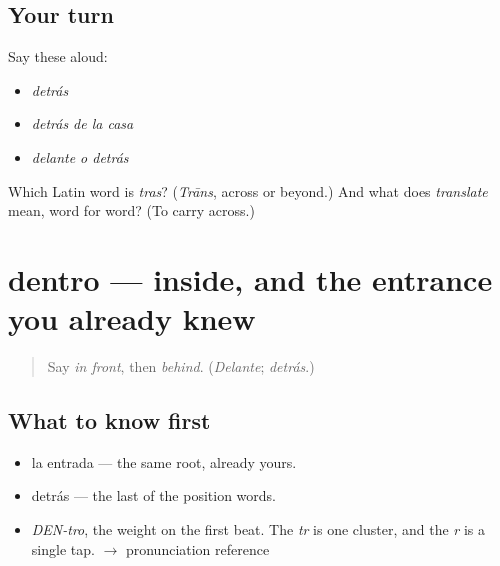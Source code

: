 \subsection*{Your turn}
Say these aloud:

\begin{itemize}
\raggedright
  \item \emph{detrás}
  \item \emph{detrás de la casa}
  \item \emph{delante o detrás}
\end{itemize}

\begin{tcolorbox}[breakable,colback=teal!4,colframe=teal!35!black,title={Before you move on}]
Which Latin word is \emph{tras}? (\emph{Trāns}, across or beyond.) And what does \emph{translate} mean, word for word? (To carry across.)
\end{tcolorbox}
\section[dentro]{dentro — inside, and the entrance you already knew}

\label{lesson:ES-C341-dentro}



\begin{quote}
Say \emph{in front}, then \emph{behind}. (\emph{Delante}; \emph{detrás}.)
\end{quote}

\subsection*{What to know first}
\begin{itemize}
\raggedright
  \item la entrada — the same root, already yours.
  \item detrás — the last of the position words.
\end{itemize}

\begin{sounds}
\begin{itemize}
\raggedright
  \item \emph{DEN-tro}, the weight on the first beat. The \emph{tr} is one cluster, and the \emph{r} is a single tap. $\to$ pronunciation reference
\end{itemize}
\end{sounds}

